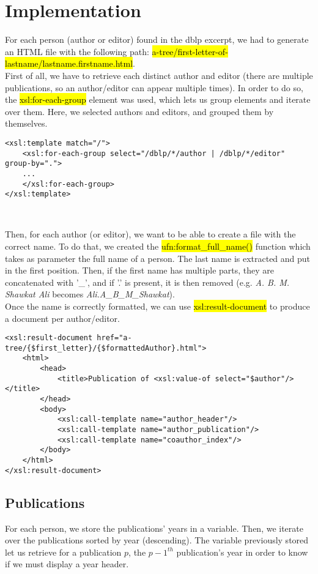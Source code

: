 \section{Implementation}

For each person (author or editor) found in the dblp excerpt, we had to generate
an HTML file with the following path:
\hl{a-tree/first-letter-of-lastname/lastname.firstname.html}.\\

First of all, we have to retrieve each distinct author and editor (there are
multiple publications, so an author/editor can appear multiple times). In order
to do so, the \hl{xsl:for-each-group} element was used, which lets us group
elements and iterate over them. Here, we selected authors and editors, and
grouped them by themselves.\\

\begin{lstlisting}
<xsl:template match="/">
    <xsl:for-each-group select="/dblp/*/author | /dblp/*/editor" group-by=".">
    ...
    </xsl:for-each-group>
</xsl:template>
\end{lstlisting}
\

Then, for each author (or editor), we want to be able to create a file with the
correct name. To do that, we created the \hl{ufn:format\_full\_name()} function
which takes as parameter the full name of a person. The last name is extracted
and put in the first position. Then, if the first name has multiple parts, they
are concatenated with '\_', and if '.' is present, it is then removed (e.g.
\emph{A. B. M. Shawkat Ali} becomes \emph{Ali.A\_B\_M\_Shawkat}).\\

Once the name is correctly formatted, we can use \hl{xsl:result-document} to
produce a document per author/editor.\\

\begin{lstlisting}
<xsl:result-document href="a-tree/{$first_letter}/{$formattedAuthor}.html">
    <html>
        <head>
            <title>Publication of <xsl:value-of select="$author"/></title>
        </head>
        <body>
            <xsl:call-template name="author_header"/>
            <xsl:call-template name="author_publication"/>
            <xsl:call-template name="coauthor_index"/>
        </body>
    </html>
</xsl:result-document>
\end{lstlisting}

\subsection{Publications}
For each person, we store the publications' years in a variable. Then, we iterate
over the publications sorted by year (descending). The variable previously stored let us
retrieve for a publication $p$, the ${p-1}^{th}$ publication's year in order to
know if we must display a year header.\\

